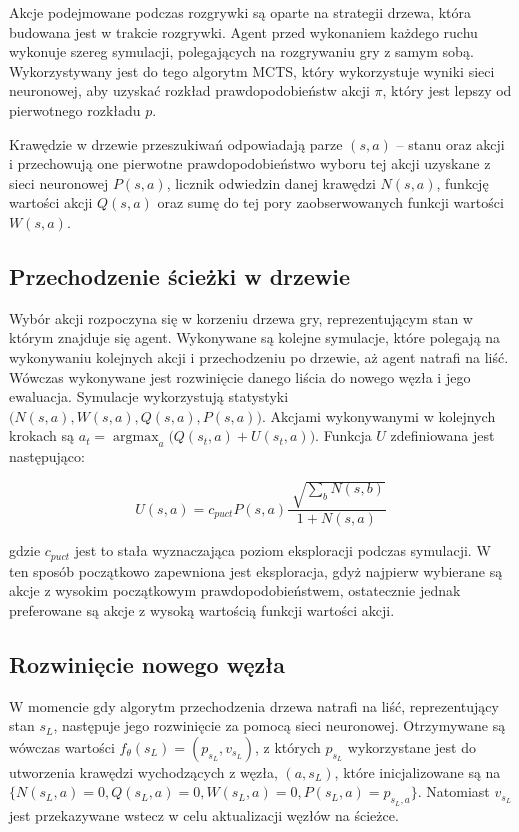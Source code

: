 \documentclass[licencjacka]{pracamgr}
\begin{document}
Akcje podejmowane podczas rozgrywki są oparte na strategii drzewa, która budowana jest w trakcie rozgrywki. Agent przed wykonaniem każdego ruchu wykonuje szereg symulacji, polegających na rozgrywaniu gry z samym sobą. Wykorzystywany jest do tego algorytm MCTS, który wykorzystuje wyniki sieci neuronowej, aby uzyskać rozkład prawdopodobieństw akcji $\pi$, który jest lepszy od pierwotnego rozkładu $p$. 

Krawędzie w drzewie przeszukiwań odpowiadają parze $(s, a)$ -- stanu oraz akcji i przechowują one pierwotne prawdopodobieństwo wyboru tej akcji uzyskane z sieci neuronowej $P(s, a)$, licznik odwiedzin danej krawędzi $N(s,a)$, funkcję wartości akcji $Q(s,a)$ oraz sumę do tej pory zaobserwowanych funkcji wartości $W(s,a)$. 

\subsection{Przechodzenie ścieżki w drzewie}

Wybór akcji rozpoczyna się w korzeniu drzewa gry, reprezentującym stan w którym znajduje się agent. Wykonywane są kolejne symulacje, które polegają na wykonywaniu kolejnych akcji i przechodzeniu po drzewie, aż agent natrafi na liść. Wówczas wykonywane jest rozwinięcie danego liścia do nowego węzła i jego ewaluacja. Symulacje wykorzystują statystyki $\big(N(s,a), W(s,a), Q(s,a), P(s,a) \big)$. Akcjami wykonywanymi w kolejnych krokach są $a_t = \operatorname*{argmax}_a \big( Q(s_t, a) + U(s_t, a) \big)$. Funkcja $U$ zdefiniowana jest następująco:

$$ U(s,a) = c_{puct} P(s,a) \frac{\sqrt[]{\sum_b N(s,b)}}{1 + N(s,a)} $$ 

gdzie $c_{puct}$ jest to stała wyznaczająca poziom eksploracji podczas symulacji. W ten sposób początkowo zapewniona jest eksploracja, gdyż najpierw wybierane są akcje z wysokim początkowym prawdopodobieństwem, ostatecznie jednak preferowane są akcje z wysoką wartością funkcji wartości akcji.

\subsection{Rozwinięcie nowego węzła}

W momencie gdy algorytm przechodzenia drzewa natrafi na liść, reprezentujący stan $s_L$, następuje jego rozwinięcie za pomocą sieci neuronowej. Otrzymywane są wówczas wartości $f_\theta(s_L) = (p_{s_L}, v_{s_L})$, z których $p_{s_L}$ wykorzystane jest do utworzenia krawędzi wychodzących z węzła, $(a, s_L)$, które inicjalizowane są na $\big\{N(s_L, a) = 0, Q(s_L, a) = 0, W(s_L, a) = 0, P(s_L, a) = p_{s_L, a}  \big\}$. Natomiast $v_{s_L}$ jest przekazywane wstecz w celu aktualizacji węzłów na ścieżce.
\end{document}
